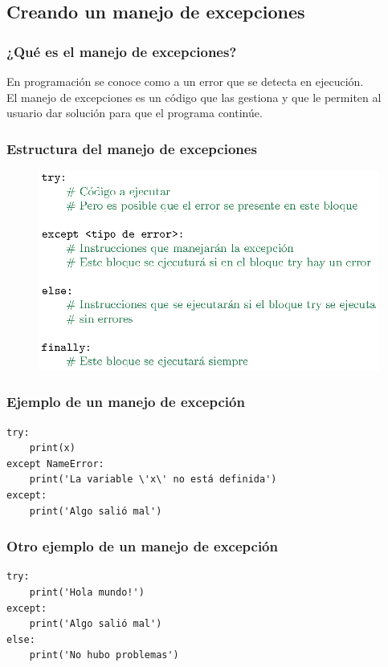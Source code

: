 \documentclass[12pt]{beamer}
\begin{document}
\subsection{Creando un manejo de excepciones}

\begin{frame}
\frametitle{¿Qué es el manejo de excepciones?}
En programación se conoce como  a un error que se detecta en ejecución.
\\
\bigskip
\pause
El manejo de excepciones es un código que las gestiona y que le permiten al usuario dar solución para que el programa continúe.
\end{frame}
\begin{frame}[fragile]
\frametitle{Estructura del manejo de excepciones}
\begin{figure}
    \centering
    \includegraphics[scale=0.95]{Imagenes/Manejo_Excepciones_01.eps}
\end{figure}
\end{frame}
\begin{frame}[fragile]
\frametitle{Ejemplo de un manejo de excepción}
\begin{lstlisting}[caption=Un error por la variable x no definida]
try:
    print(x)
except NameError:
    print('La variable \'x\' no está definida')
except:
    print('Algo salió mal')
\end{lstlisting}
\end{frame}
\begin{frame}[fragile]
\frametitle{Otro ejemplo de un manejo de excepción}
\begin{lstlisting}[caption=Manejo con un else]
    try:
    print('Hola mundo!')
except:
    print('Algo salió mal')
else:
    print('No hubo problemas')
\end{lstlisting}
\end{frame}
\end{document}
